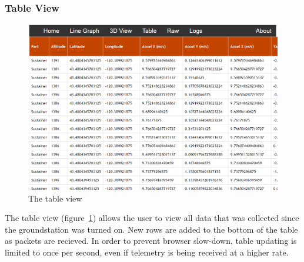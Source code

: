 \documentclass[10pt,draftclsnofoot,onecolumn]{IEEEtran}
\begin{document}
\subsubsection{Table View}
	\begin{figure}[thbp!]
		\centering\includegraphics[width=170mm]{gs-table}
		\caption{The table view}
		\label{gs-table}
	\end{figure}
The table view (figure~\ref{gs-table}) allows the user to view all data that was collected since
the groundstation was turned on.
New rows are added to the bottom of the table as packets are recieved.
In order to prevent browser slow-down, table updating is limited to once per second,
even if telemetry is being received at a higher rate.
\end{document}
